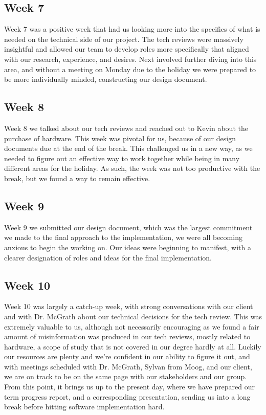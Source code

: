     \subsection{Week 7}
        Week 7 was a positive week that had us looking more into the specifics of what is needed on the technical side of our project.
        The tech reviews were massively insightful and allowed our team to develop roles more specifically that aligned with our research, experience, and desires.
        Next involved further diving into this area, and without a meeting on Monday due to the holiday we were prepared to be more individually minded, constructing our design document.
    \subsection{Week 8}
        Week 8 we talked about our tech reviews and reached out to Kevin about the purchase of hardware.
        This week was pivotal for us, because of our design documents due at the end of the break.
        This challenged us in a new way, as we needed to figure out an effective way to work together while being in many different areas for the holiday.
        As such, the week was not too productive with the break, but we found a way to remain effective. 
    \subsection{Week 9}
        Week 9 we submitted our design document, which was the largest commitment we made to the final approach to the implementation, we were all becoming anxious to begin the working on.
        Our ideas were beginning to manifest, with a clearer designation of roles and ideas for the final implementation. 
    \subsection{Week 10}
        Week 10 was largely a catch-up week, with strong conversations with our client and with Dr. McGrath about our technical decisions for the tech review.
        This was extremely valuable to us, although not necessarily encouraging as we found a fair amount of misinformation was produced in our tech reviews, mostly related to hardware, a scope of study that is not covered in our degree hardly at all.
        Luckily our resources are plenty and we’re confident in our ability to figure it out, and with meetings scheduled with Dr. McGrath, Sylvan from Moog, and our client, we are on track to be on the same page with our stakeholders and our group.
        From this point, it brings us up to the present day, where we have prepared our term progress report, and a corresponding presentation, sending us into a long break before hitting software implementation hard. 

